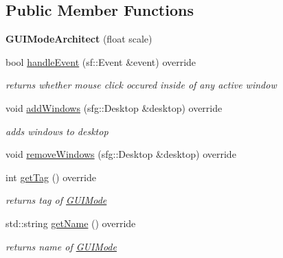 \subsection*{Public Member Functions}
\begin{DoxyCompactItemize}
\item 
\hypertarget{classGUIModeArchitect_a25d9eef53cf72c398980f2f136b9db08}{{\bfseries G\-U\-I\-Mode\-Architect} (float scale)}\label{classGUIModeArchitect_a25d9eef53cf72c398980f2f136b9db08}

\item 
\hypertarget{classGUIModeArchitect_a1910f3c1df018197bcfadba64ff75e8a}{bool \hyperlink{classGUIModeArchitect_a1910f3c1df018197bcfadba64ff75e8a}{handle\-Event} (sf\-::\-Event \&event) override}\label{classGUIModeArchitect_a1910f3c1df018197bcfadba64ff75e8a}

\begin{DoxyCompactList}\small\item\em returns whether mouse click occured inside of any active window \end{DoxyCompactList}\item 
\hypertarget{classGUIModeArchitect_ae2955e9bcc44c9e98b6847ded59776f2}{void \hyperlink{classGUIModeArchitect_ae2955e9bcc44c9e98b6847ded59776f2}{add\-Windows} (sfg\-::\-Desktop \&desktop) override}\label{classGUIModeArchitect_ae2955e9bcc44c9e98b6847ded59776f2}

\begin{DoxyCompactList}\small\item\em adds windows to desktop \end{DoxyCompactList}\item 
void \hyperlink{classGUIModeArchitect_aea6eeeba6cf9597beb326d38e63af49d}{remove\-Windows} (sfg\-::\-Desktop \&desktop) override
\item 
\hypertarget{classGUIModeArchitect_a202aafb3e8a66efd900860a780e9b316}{int \hyperlink{classGUIModeArchitect_a202aafb3e8a66efd900860a780e9b316}{get\-Tag} () override}\label{classGUIModeArchitect_a202aafb3e8a66efd900860a780e9b316}

\begin{DoxyCompactList}\small\item\em returns tag of \hyperlink{classGUIMode}{G\-U\-I\-Mode} \end{DoxyCompactList}\item 
\hypertarget{classGUIModeArchitect_a9c018f2150bcd1fc4e3cecf43702418a}{std\-::string \hyperlink{classGUIModeArchitect_a9c018f2150bcd1fc4e3cecf43702418a}{get\-Name} () override}\label{classGUIModeArchitect_a9c018f2150bcd1fc4e3cecf43702418a}

\begin{DoxyCompactList}\small\item\em returns name of \hyperlink{classGUIMode}{G\-U\-I\-Mode} \end{DoxyCompactList}\end{DoxyCompactItemize}



